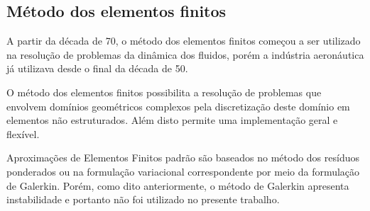 \subsection{Método dos elementos finitos}
{
	A partir da década de 70, o método dos elementos finitos começou a ser utilizado na resolução de problemas da dinâmica dos fluidos, porém a indústria aeronáutica já utilizava desde o final da década de 50.  
	
	O método dos elementos finitos possibilita a resolução de problemas que envolvem domínios geométricos complexos pela discretização deste domínio em elementos não estruturados. Além disto permite uma implementação geral e flexível. 
	
	Aproximações de Elementos Finitos padrão são baseados no método dos resíduos ponderados ou na formulação variacional correspondente por meio da formulação de Galerkin. Porém, como dito anteriormente, o método de Galerkin apresenta instabilidade e portanto não foi utilizado no presente trabalho.
}
